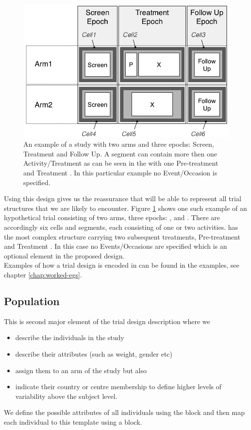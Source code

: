  \begin{figure}[htb]
 \centering
 \includegraphics[height=0.35\textheight]{pics/templateTrialDesign}%
 \caption{An example of a study with two arms and three epochs: Screen, 
 Treatment and Follow Up. A segment can contain more then one Activity/Treatment
 as can be seen in the  with one Pre-treatment  and Treatment .
 In this particular example no Event/Occasion is specified.}
 \label{fig:templateTrialDesign}
 \end{figure}
 Using this design gives us the reassurance that \pharmml will be able
 to represent all trial structures that we are likely to encounter. Figure 
 \ref{fig:templateTrialDesign} shows one such example of an hypothetical trial
 consisting of two arms, three epochs: ,  and 
 . There are accordingly six cells and segments, each consisting of one
 or two activities.  has the most complex structure carrying two
 subsequent treatments, Pre-treatment  and Treatment . In this case 
 no Events/Occasions are specified which is an optional element in the 
 proposed design.\\
 Examples of how a trial design is encoded in \pharmml can be found in
 the examples, see chapter \ref{chap:worked-egs}.


\subsection{Population}
\label{subsec:TrialPopulation}

This is second major element of the trial design description where we  
\begin{itemize}
\item
describe the individuals in the study
\item
describe their attributes (such as weight, gender etc)
\item
assign them to an arm of the study but also 
\item
indicate their country or centre membership to define higher levels of variability above the subject level. 
\end{itemize}
We define the possible attributes of all individuals using the  block and then map each individual to this template using a  block.

